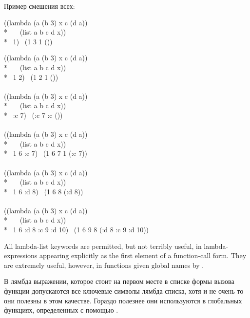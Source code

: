 \noindent 
Пример смешения всех:
\begin{lisp}
((lambda (a  (b 3)  x  c (d a)) \\*
~~~(list a b c d x)) \\*
~1)   \EV\ (1 3 {\nil} 1 ())
\end{lisp}

\newpage%

\begin{lisp}
((lambda (a  (b 3)  x  c (d a)) \\*
~~~(list a b c d x)) \\*
~1 2)   \EV\ (1 2 {\nil} 1 ()) \\
 \\
((lambda (a  (b 3)  x  c (d a)) \\*
~~~(list a b c d x)) \\*
~:c 7)   \EV\ (:c 7 {\nil} :c ()) \\
 \\
((lambda (a  (b 3)  x  c (d a)) \\*
~~~(list a b c d x)) \\*
~1 6 :c 7)   \EV\ (1 6 7 1 (:c 7)) \\
 \\
((lambda (a  (b 3)  x  c (d a)) \\*
~~~(list a b c d x)) \\*
~1 6 :d 8)   \EV\ (1 6 {\nil} 8 (:d 8)) \\
 \\
((lambda (a  (b 3)  x  c (d a)) \\*
~~~(list a b c d x)) \\*
~1 6 :d 8 :c 9 :d 10)   \EV\ (1 6 9 8 (:d 8 :c 9 :d 10))
\end{lisp}

All lambda-list keywords are permitted, but not terribly useful, in
lambda-expressions appearing explicitly as the first element of a
function-call form.  They are extremely
useful, however, in functions given global names by .

В лямбда выражении, которое стоит на первом месте в списке формы вызова функции
допускаются все ключевые символы лямбда списка, хотя и не очень то они полезны в
этом качестве.
Гораздо полезнее они используются в глобальных функциях, определенных с помощью
.

